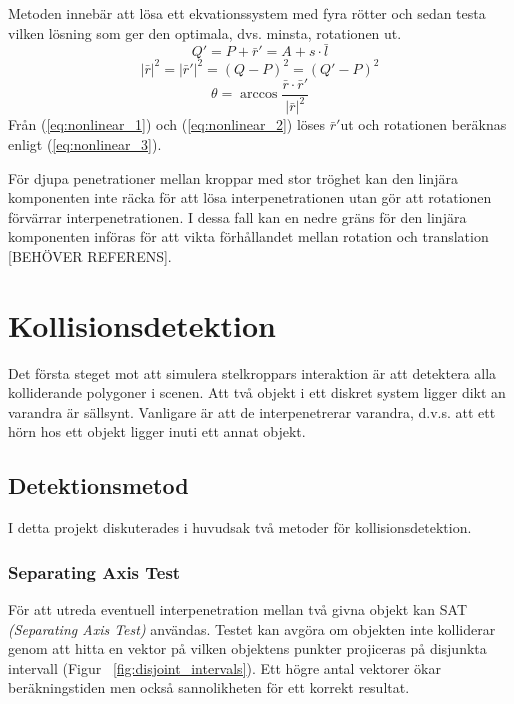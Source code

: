 \documentclass[a4paper,12pt,twopage,swedish]{article}
\begin{document}
		Metoden innebär att lösa ett ekvationssystem med fyra rötter och sedan testa vilken lösning som ger den optimala, dvs. minsta,  rotationen ut.
		\begin{equation} \label{eq:nonlinear_1}
			Q' = P + \bar{r}' = A + s \cdot \bar{l}
		\end{equation}
		\begin{equation}\label{eq:nonlinear_2}
			|\bar{r}|^2 = |\bar{r}'|^2 = (Q-P)^2 = (Q' - P)^2
		\end{equation}
		\begin{equation}\label{eq:nonlinear_3}
			\theta = \arccos{\frac{\bar{r}\cdot\bar{r} '}{|\bar{r}|^2}}
		\end{equation}
		Från (\ref{eq:nonlinear_1}) och (\ref{eq:nonlinear_2}) löses $\bar{r}'$ut och rotationen beräknas enligt (\ref{eq:nonlinear_3}).

		För djupa penetrationer mellan kroppar med stor tröghet kan den linjära komponenten inte räcka för att lösa interpenetrationen utan gör att rotationen förvärrar interpenetrationen. I dessa fall kan en nedre gräns för den linjära komponenten införas för att vikta förhållandet mellan rotation och translation [BEHÖVER REFERENS].




\section{Kollisionsdetektion}

Det första steget mot att simulera stelkroppars interaktion är att detektera alla kolliderande polygoner i scenen. Att två objekt i ett diskret system ligger dikt an varandra är sällsynt. Vanligare är att de interpenetrerar varandra, d.v.s. att ett hörn hos ett objekt ligger inuti ett annat objekt.

\subsection{Detektionsmetod}

I detta projekt diskuterades i huvudsak två metoder för kollisionsdetektion.

\subsubsection{Separating Axis Test}
För att utreda eventuell interpenetration mellan två givna objekt kan SAT \cite[s.~29]{vella08} \emph{(Separating Axis Test)} användas. Testet kan avgöra om objekten inte kolliderar genom att hitta en vektor på vilken objektens punkter projiceras på disjunkta intervall (Figur ~\ref{fig:disjoint_intervals}). Ett högre antal vektorer ökar beräkningstiden men också sannolikheten för ett korrekt resultat.
\end{document}
